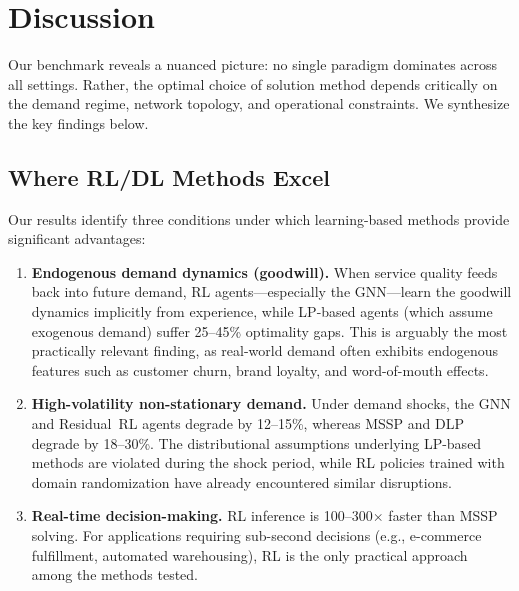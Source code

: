 
\section{Discussion}\label{sec:discussion}

Our benchmark reveals a nuanced picture: no single paradigm dominates
across all settings. Rather, the optimal choice of solution method
depends critically on the demand regime, network topology, and
operational constraints. We synthesize the key findings below.

\subsection{Where RL/DL Methods Excel}

Our results identify three conditions under which learning-based
methods provide significant advantages:

\begin{enumerate}
  \item \textbf{Endogenous demand dynamics (goodwill).} When service
        quality feeds back into future demand, RL
        agents---especially the GNN---learn the goodwill dynamics
        implicitly from experience, while LP-based agents (which
        assume exogenous demand) suffer 25--45\% optimality gaps. This
        is arguably the most practically relevant finding, as real-world
        demand often exhibits endogenous features such as customer
        churn, brand loyalty, and word-of-mouth effects.

  \item \textbf{High-volatility non-stationary demand.} Under demand
        shocks, the GNN and Residual~RL agents degrade by 12--15\%,
        whereas MSSP and DLP degrade by 18--30\%. The distributional
        assumptions underlying LP-based methods are violated during
        the shock period, while RL policies trained with domain
        randomization have already encountered similar disruptions.

  \item \textbf{Real-time decision-making.} RL inference is
        100--300$\times$ faster than MSSP solving. For applications
        requiring sub-second decisions (e.g., e-commerce fulfillment,
        automated warehousing), RL is the only practical approach
        among the methods tested.
\end{enumerate}

